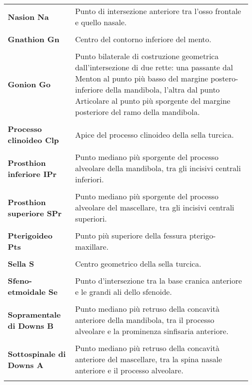 \begin{longtable}{>{\bfseries}p{5cm}X}
Nasion \newline Na & Punto di intersezione anteriore tra l'osso frontale e quello nasale.\\\\
Gnathion \newline Gn & Centro del contorno inferiore del mento.\\\\
Gonion \newline Go & Punto bilaterale di costruzione geometrica dall'intersezione di due rette: una passante dal Menton al punto più basso del margine postero-inferiore della mandibola, l'altra dal punto Articolare al punto più sporgente del margine posteriore del ramo della mandibola.\\\\
Processo clinoideo \newline Clp & Apice del processo clinoideo della sella turcica.\\\\
Prosthion inferiore \newline IPr & Punto mediano più sporgente del processo alveolare della mandibola, tra gli incisivi centrali inferiori.\\\\
Prosthion superiore \newline SPr & Punto mediano più sporgente del processo alveolare del mascellare, tra gli incisivi centrali superiori.\\\\
Pterigoideo \newline Pts & Punto più superiore della fessura pterigo-maxillare.\\\\
Sella \newline S & Centro geometrico della sella turcica.\\\\
Sfeno-etmoidale \newline Se & Punto d'intersezione tra la base cranica anteriore e le grandi ali dello sfenoide.\\\\
Sopramentale di Downs \newline B & Punto mediano più retruso della concavità anteriore della mandibola, tra il processo alveolare e la prominenza sinfisaria anteriore.\\\\
Sottospinale di Downs \newline A & Punto mediano più retruso della concavità anteriore del mascellare, tra la spina nasale anteriore e il processo alveolare.\\\\

\end{longtable}
